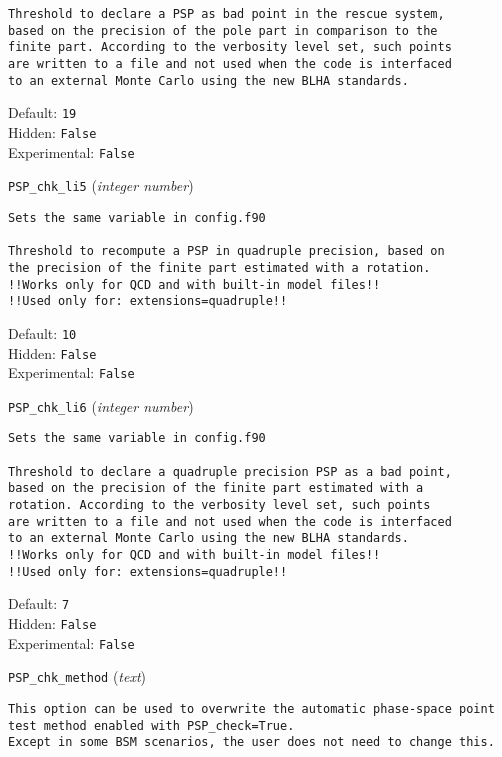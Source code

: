 \begin{basedescript}{\desclabelstyle{\pushlabel}}
\begin{verbatim}
Threshold to declare a PSP as bad point in the rescue system,
based on the precision of the pole part in comparison to the
finite part. According to the verbosity level set, such points
are written to a file and not used when the code is interfaced
to an external Monte Carlo using the new BLHA standards.
\end{verbatim}
Default: \verb|19|
\\Hidden: \verb|False|
\\Experimental: \verb|False|
\\\item[\colorbox{gray!30}{\texttt{PSP\_chk\_li5}}] (\textit{integer number})
\begin{verbatim}
Sets the same variable in config.f90

Threshold to recompute a PSP in quadruple precision, based on
the precision of the finite part estimated with a rotation.
!!Works only for QCD and with built-in model files!!
!!Used only for: extensions=quadruple!!
\end{verbatim}
Default: \verb|10|
\\Hidden: \verb|False|
\\Experimental: \verb|False|
\\\item[\colorbox{gray!30}{\texttt{PSP\_chk\_li6}}] (\textit{integer number})
\begin{verbatim}
Sets the same variable in config.f90

Threshold to declare a quadruple precision PSP as a bad point,
based on the precision of the finite part estimated with a
rotation. According to the verbosity level set, such points
are written to a file and not used when the code is interfaced
to an external Monte Carlo using the new BLHA standards.
!!Works only for QCD and with built-in model files!!
!!Used only for: extensions=quadruple!!
\end{verbatim}
Default: \verb|7|
\\Hidden: \verb|False|
\\Experimental: \verb|False|
\\\item[\colorbox{gray!30}{\texttt{PSP\_chk\_method}}] (\textit{text})
\begin{verbatim}
This option can be used to overwrite the automatic phase-space point
test method enabled with PSP_check=True.
Except in some BSM scenarios, the user does not need to change this.


\end{verbatim}
\end{basedescript}
